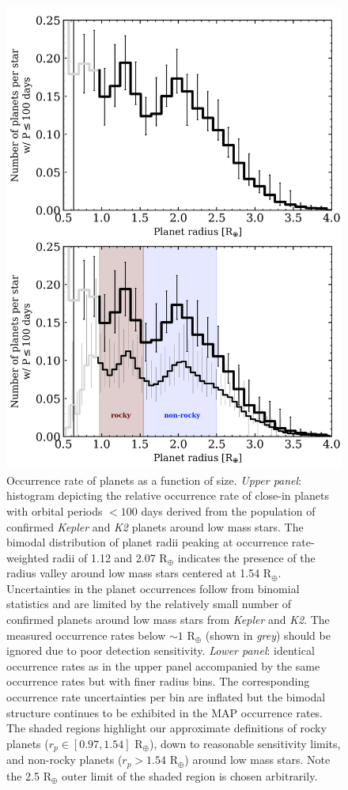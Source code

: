 \documentclass[twocolumn]{emulateapj}
\newcommand{\kepler}[1]{\emph{Kepler}#1}
\newcommand{\ktwo}[1]{\emph{K2}#1}
\begin{document}
  
\begin{figure}
  \centering
  \includegraphics[scale=.8]{figures/rphist_double.png}
  \caption{Occurrence rate of planets as a function of size. \emph{Upper panel}:
    histogram depicting the relative occurrence
    rate of close-in planets with orbital periods $<100$ days derived from the population of confirmed
    \kepler{} and \ktwo{} planets around low mass stars. The bimodal distribution of planet radii peaking
    at occurrence rate-weighted radii of 1.12 and 2.07 R$_{\oplus}$ indicates the presence of the radius valley
    around low mass stars centered at 1.54 R$_{\oplus}$. Uncertainties in the planet occurrences follow from binomial
    statistics and are limited by
    the relatively small number of confirmed planets around low mass stars from \kepler{} and \ktwo{.} 
    The measured occurrence rates below $\sim 1$ R$_{\oplus}$ (shown in \emph{grey}) should be ignored due to
    poor detection sensitivity. \emph{Lower panel}: identical occurrence rates as in the upper panel 
    accompanied by the same occurrence rates but with finer radius bins.
    The corresponding occurrence rate uncertainties per bin are inflated but the bimodal structure continues
    to be exhibited in the MAP occurrence rates. The shaded regions highlight our approximate
    definitions of rocky planets ($r_p \in [0.97,1.54]$ R$_{\oplus}$), down to reasonable sensitivity limits,
    and non-rocky planets ($r_p > 1.54$ R$_{\oplus}$) around low mass stars. Note the 2.5 R$_{\oplus}$ outer limit of
    the shaded region is chosen arbitrarily.}
  \label{fig:rphist}
\end{figure}
\end{document}
